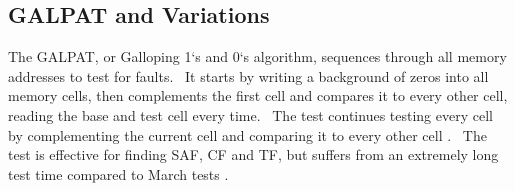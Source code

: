 \subsection{GALPAT and Variations}
The GALPAT, or Galloping 1`s and 0`s algorithm, sequences through all memory addresses to test for faults.  It starts by writing a background of zeros into all memory cells, then complements the first cell and compares it to every other cell, reading the base and test cell every time.  The test continues testing every cell by complementing the current cell and comparing it to every other cell \cite{VanDeGoor1991}.  The test is effective for finding SAF, CF and TF, but suffers from an extremely long test time compared to March tests \cite{1327984}.  

